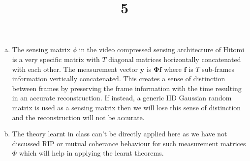 \documentclass[a4paper]{article}
\title{5}
\date{}
\begin{document}
\maketitle
\begin{enumerate}[(a)]
\item The sensing matrix $\phi$ in the video compressed sensing architecture of Hitomi is a very specific matrix with $T$ diagonal matrices horizontally concatenated with each other. The measurement vector $\bm{y}$ is $\bm{\Phi f}$ where $\bm{f}$ is $T$ sub-frames information vertically concatenated. This creates a sense of distinction between frames by preserving the frame information with the time resulting in an accurate reconstruction. If instead, a generic IID Gaussian random matrix is used as a sensing matrix then we will lose this sense of distinction and the reconstruction will not be accurate.
\item The theory learnt in class can't be directly applied here as we have not discussed RIP or mutual coherance behaviour for such measurement matrices $\Phi$ which will help in applying the learnt theorems.
\end{enumerate}
\end{document}
